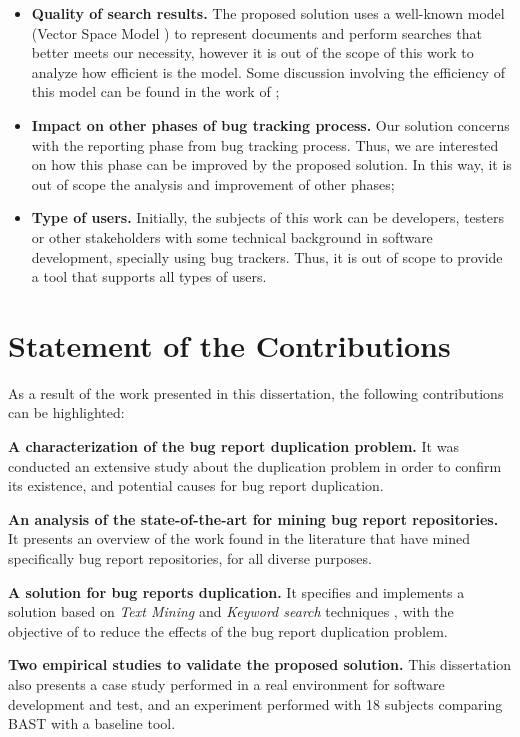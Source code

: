 \begin{itemize}
  \item \textbf{Quality of search results.} The proposed solution uses a
  well-known model (Vector Space Model \citep{Salton1975}) to represent
  documents and perform searches that better meets our necessity, however it
  is out of the scope of this work to analyze how efficient is the model. Some
  discussion involving the efficiency of this model can be found in the work
  of \citet{Salton1975};
  
  \item \textbf{Impact on other phases of bug tracking process.} Our solution
  concerns with the reporting phase from bug tracking process. Thus, we are
  interested on how this phase can be improved by the proposed solution. In this
  way, it is out of scope the analysis and improvement of other phases;
  
  \item \textbf{Type of users.} Initially, the subjects of this work can be
  developers, testers or other stakeholders with some technical background in
  software development, specially using bug trackers. Thus, it is out of scope
  to provide a tool that supports all types of users.
\end{itemize}

\section{Statement of the Contributions}
\label{sc:contributions}
As a result of the work presented in this dissertation, the following
contributions can be highlighted:

\textbf{A characterization of the bug report duplication problem.} It was
conducted an extensive study about the duplication problem in order to confirm
its existence, and potential causes for bug report duplication.

\textbf{An analysis of the state-of-the-art for mining bug report repositories.}
It presents an overview of the work found in the literature that have
mined specifically bug report repositories, for all diverse purposes.

\textbf{A solution for bug reports duplication.} It specifies and
implements a solution based on \emph{Text Mining} and \emph{Keyword search}
techniques \citep{Baeza1999}, with the objective of to reduce the effects of
the bug report duplication problem.

\textbf{Two empirical studies to validate the proposed solution.} This
dissertation also presents a case study performed in a real environment for
software development and test, and an experiment performed with 18 subjects
comparing \ac{BAST} with a baseline tool.

